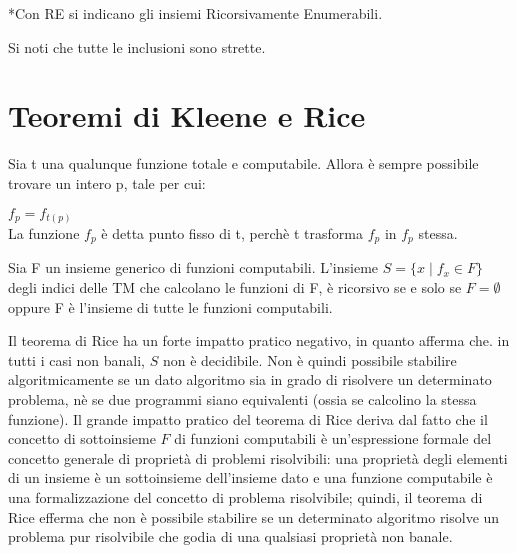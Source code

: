   *Con RE si indicano gli insiemi Ricorsivamente Enumerabili.

  Si noti che tutte le inclusioni sono strette.

  \section{Teoremi di Kleene e Rice}

  \begin{theorem} 
    Sia t una qualunque funzione totale e computabile. Allora è sempre possibile trovare un intero p, tale per cui:
    
    \(f_p=f_{t(p)}\)\\
    La funzione \(f_p\) è detta punto fisso di t, perchè t trasforma \(f_p\) in \(f_p\) stessa.
  \end{theorem}

  \begin{theorem}
    Sia F un insieme generico di funzioni computabili. L'insieme \(S=\{x\;|\;f_x\in F\}\) degli indici delle TM che calcolano le funzioni di F, è ricorsivo se e solo se \(F=\emptyset\) oppure F è l'insieme di tutte le funzioni computabili.
  \end{theorem}

  Il teorema di Rice ha un forte impatto pratico negativo, in quanto afferma che. in tutti i casi non banali, \(S\) non è decidibile. Non è quindi possibile stabilire algoritmicamente se un dato algoritmo sia in grado di risolvere un determinato problema, nè se due programmi siano equivalenti (ossia se calcolino la stessa funzione). Il grande impatto pratico del teorema di Rice deriva dal fatto che il concetto di sottoinsieme \(F\) di funzioni computabili è un'espressione formale del concetto generale di proprietà di problemi risolvibili: una proprietà degli elementi di un insieme è un sottoinsieme dell'insieme dato e una funzione computabile è una formalizzazione del concetto di problema risolvibile; quindi, il teorema di Rice efferma che non è possibile stabilire se un determinato algoritmo risolve un problema pur risolvibile che godia di una qualsiasi proprietà non banale.